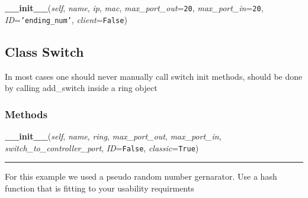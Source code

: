 \hspace{.8\funcindent}\begin{boxedminipage}{\funcwidth}

    \raggedright \textbf{\_\_init\_\_}(\textit{self}, \textit{name}, \textit{ip}, \textit{mac}, \textit{max\_port\_out}={\tt 20}, \textit{max\_port\_in}={\tt 20}, \textit{ID}={\tt \texttt{'}\texttt{ending\_num}\texttt{'}}, \textit{client}={\tt False})

\setlength{\parskip}{2ex}
\setlength{\parskip}{1ex}
    \end{boxedminipage}



\subsection{Class Switch}

    \label{Data_Plane_DHT:Switch}
In most cases one should never manually call switch init methods, should be
done by calling add\_switch inside a ring object



  \subsubsection{Methods}

    \label{Data_Plane_DHT:Switch:__init__}

    \vspace{0.5ex}

\hspace{.8\funcindent}\begin{boxedminipage}{\funcwidth}

    \raggedright \textbf{\_\_init\_\_}(\textit{self}, \textit{name}, \textit{ring}, \textit{max\_port\_out}, \textit{max\_port\_in}, \textit{switch\_to\_controller\_port}, \textit{ID}={\tt False}, \textit{classic}={\tt True})

    \vspace{-1.5ex}

    \rule{\textwidth}{0.5\fboxrule}
\setlength{\parskip}{2ex}
    For this example we used a pseudo random number gernarator. Use a hash 
    function that is fitting to your usability requirments

\setlength{\parskip}{1ex}
    \end{boxedminipage}

